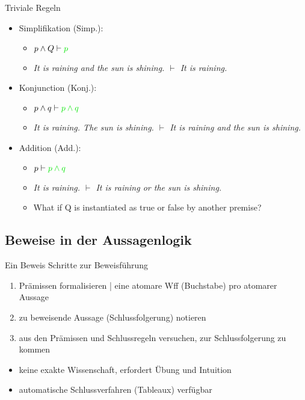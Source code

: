 \begin{frame}
  {Triviale Regeln}
  \begin{itemize}[<+->]
    \item \alert{Simplifikation (Simp.)}:
      \begin{itemize}
        \item \alert{$p\wedge Q\vdash\gruen{p}$}
        \item \emph{It is raining and the sun is shining. $\vdash$ It is raining.}
      \end{itemize}
      \Halbzeile
    \item \alert{Konjunction (Konj.)}:
      \begin{itemize}
        \item \alert{$p\wedge q\vdash\gruen{p\wedge q}$}
        \item \emph{It is raining. The sun is shining. $\vdash$ It is raining and the sun is shining.}
      \end{itemize}
      \Halbzeile
    \item \alert{Addition (Add.)}:
      \begin{itemize}
        \item \alert{$p\vdash\gruen{p\wedge q}$}
        \item \emph{It is raining. $\vdash$ It is raining or the sun is shining.}
        \item What if Q is instantiated as true or false by another premise?
      \end{itemize}
  \end{itemize}
\end{frame}

\subsection{Beweise in der Aussagenlogik}

\begin{frame}
  {Ein Beweis}
  \onslide<+->
  \onslide<+->
  Schritte zur Beweisführung\\
  \Halbzeile
  \begin{enumerate}[<+->]
    \item Prämissen formalisieren | eine atomare Wff (Buchstabe) pro atomarer Aussage
    \item zu beweisende Aussage (Schlussfolgerung) notieren
    \item aus den Prämissen und Schlussregeln versuchen, zur Schlussfolgerung zu kommen
  \end{enumerate}
  \Halbzeile
  \begin{itemize}[<+->]
    \item keine exakte Wissenschaft, erfordert Übung und Intuition
    \item automatische Schlussverfahren (Tableaux) verfügbar \citep{ParteeEa1990}
  \end{itemize}
\end{frame}

